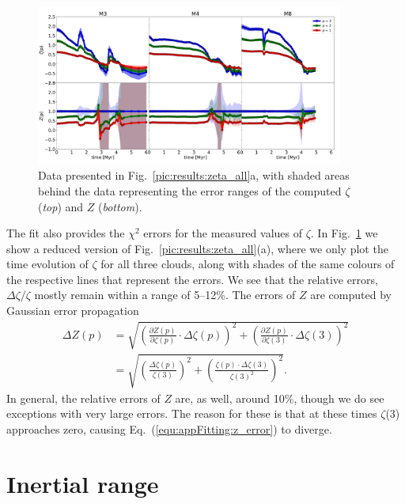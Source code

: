 \documentclass{aa}		%
\begin{document}
\begin{figure}
\centering
\includegraphics[width=0.9\textwidth]{error_vsf04_zeta_z.pdf}
\caption{
    Data presented in Fig.~\ref{pic:results:zeta_all}a, with
    shaded areas behind the data representing the error ranges of the computed $\zeta$ (\textit{top}) and $Z$ (\textit{bottom}).
}
\label{pic:appFitting:error_vsfhr04_zeta_z}
\end{figure}


The fit also provides the $\chi^2$ errors for the measured values of $\zeta$. 
In Fig.~\ref{pic:appFitting:error_vsfhr04_zeta_z} we show a reduced version of Fig.~\ref{pic:results:zeta_all}(a), where we only plot the time evolution of $\zeta$ for all three clouds, along with shades of the same colours of the respective lines that represent the errors.
We see that the relative errors, $\Delta \zeta / \zeta$ mostly remain within a range of 5--12\%. 
The errors of $Z$ are computed by Gaussian error propagation
\begin{align}\Delta Z(p) &= \sqrt{ \left( \frac{\partial Z(p)}{\partial \zeta(p)} \cdot \Delta\zeta(p) \right)^2 + \left( \frac{\partial Z(p)}{\partial \zeta(3)} \cdot \Delta\zeta(3) \right)^2 } \\
    &= \sqrt{ \left( \frac{\Delta\zeta(p)}{\zeta(3)} \right)^2 + \left( \frac{ \zeta(p) \cdot \Delta\zeta(3)}{\zeta(3)^2} \right)^2 }.
    \label{equ:appFitting:z_error}
\end{align}
\noindent In general, the relative errors of $Z$ are, as well, around 10\%, though we do see exceptions with very large errors.
The reason for these is that at these times $\zeta$(3) approaches zero, causing Eq.~(\ref{equ:appFitting:z_error}) to diverge.



\section{Inertial range}\label{appInertial}
\end{document}
